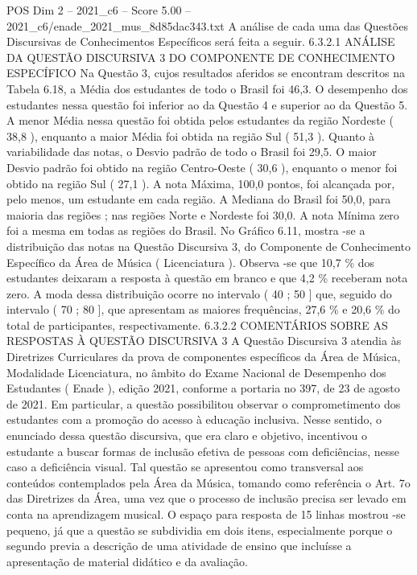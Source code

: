 \begin{textsample}{POS Dim 2 – 2021\_c6 – Score 5.00 – 2021\_c6/enade\_2021\_mus\_8d85dac343.txt}
A análise de cada uma das Questões Discursivas de Conhecimentos Específicos será feita a seguir. 6.3.2.1 ANÁLISE DA QUESTÃO DISCURSIVA 3 DO COMPONENTE DE CONHECIMENTO ESPECÍFICO Na Questão 3, cujos resultados aferidos se encontram descritos na Tabela 6.18, a Média dos estudantes de todo o Brasil foi 46,3.
O desempenho dos estudantes nessa questão foi inferior ao da Questão 4 e superior ao da Questão 5.
A menor Média nessa questão foi obtida pelos estudantes da região Nordeste ( 38,8 ), enquanto a maior Média foi obtida na região Sul ( 51,3 ).
Quanto à variabilidade das notas, o Desvio padrão de todo o Brasil foi 29,5.
O maior Desvio padrão foi obtido na região Centro-Oeste ( 30,6 ), enquanto o menor foi obtido na região Sul ( 27,1 ).
A nota Máxima, 100,0 pontos, foi alcançada por, pelo menos, um estudante em cada região.
A Mediana do Brasil foi 50,0, para maioria das regiões ; nas regiões Norte e Nordeste foi 30,0.
A nota Mínima zero foi a mesma em todas as regiões do Brasil.
No Gráfico 6.11, mostra -se a distribuição das notas na Questão Discursiva 3, do Componente de Conhecimento Específico da Área de Música ( Licenciatura ).
Observa -se que 10,7 \% dos estudantes deixaram a resposta à questão em branco e que 4,2 \% receberam nota zero.
A moda dessa distribuição ocorre no intervalo ( 40 ; 50 ] que, seguido do intervalo ( 70 ; 80 ], que apresentam as maiores frequências, 27,6 \% e 20,6 \% do total de participantes, respectivamente. 6.3.2.2 COMENTÁRIOS SOBRE AS RESPOSTAS À QUESTÃO DISCURSIVA 3 A Questão Discursiva 3 atendia às Diretrizes Curriculares da prova de componentes específicos da Área de Música, Modalidade Licenciatura, no âmbito do Exame Nacional de Desempenho dos Estudantes ( Enade ), edição 2021, conforme a portaria no 397, de 23 de agosto de 2021.
Em particular, a questão possibilitou observar o comprometimento dos estudantes com a promoção do acesso à educação inclusiva.
Nesse sentido, o enunciado dessa questão discursiva, que era claro e objetivo, incentivou o estudante a buscar formas de inclusão efetiva de pessoas com deficiências, nesse caso a deficiência visual.
Tal questão se apresentou como transversal aos conteúdos contemplados pela Área da Música, tomando como referência o Art. 7o das Diretrizes da Área, uma vez que o processo de inclusão precisa ser levado em conta na aprendizagem musical.
O espaço para resposta de 15 linhas mostrou -se pequeno, já que a questão se subdividia em dois itens, especialmente porque o segundo previa a descrição de uma atividade de ensino que incluísse a apresentação de material didático e da avaliação.

\end{textsample}
